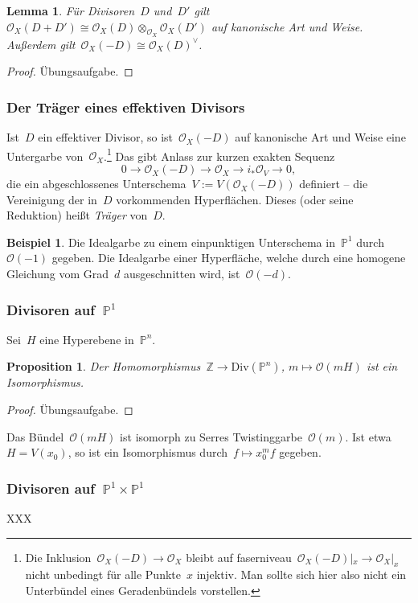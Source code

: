 \documentclass[a4paper,ngerman,12pt]{scrartcl}
\theoremstyle{definition}
\newtheorem{ex}[defn]{Beispiel}
\theoremstyle{plain}
\newtheorem{prop}[defn]{Proposition}
\newtheorem{lemma}[defn]{Lemma}
\theoremstyle{remark}
\newcommand{\ZZ}{\mathbb{Z}}
\newcommand{\PP}{\mathbb{P}}
\renewcommand{\O}{\mathcal{O}}
\newcommand{\lra}{\longrightarrow}
\newcommand{\Div}{\mathrm{Div}}
\begin{document}
\begin{lemma}Für Divisoren~$D$ und~$D'$ gilt~$\O_X(D + D') \cong \O_X(D)
\otimes_{\O_X} \O_X(D')$ auf kanonische Art und Weise. Außerdem gilt~$\O_X(-D)
\cong \O_X(D)^\vee$.\end{lemma}
\begin{proof}Übungsaufgabe.
\end{proof}


\subsubsection*{Der Träger eines effektiven Divisors}

Ist~$D$ ein effektiver Divisor, so ist~$\O_X(-D)$ auf kanonische Art
und Weise eine Untergarbe von~$\O_X$.\footnote{Die Inklusion~$\O_X(-D) \to
\O_X$ bleibt auf faserniveau~$\O_X(-D)|_x \to \O_X|_x$ nicht unbedingt für alle
Punkte~$x$ injektiv. Man sollte sich hier also nicht ein Unterbündel eines
Geradenbündels vorstellen.} Das gibt Anlass zur kurzen exakten Sequenz
\[ 0 \lra \O_X(-D) \lra \O_X \lra i_*\O_V \lra 0, \]
die ein abgeschlossenes Unterschema~$V := V(\O_X(-D))$ definiert -- die Vereinigung
der in~$D$ vorkommenden Hyperflächen. Dieses (oder seine Reduktion) heißt
\emph{Träger} von~$D$.

\begin{ex}Die Idealgarbe zu einem
einpunktigen Unterschema in~$\PP^1$ durch~$\O(-1)$ gegeben. Die Idealgarbe
einer Hyperfläche, welche durch eine homogene Gleichung vom Grad~$d$
ausgeschnitten wird, ist~$\O(-d)$.
\end{ex}


\subsubsection*{Divisoren auf~$\PP^1$}

Sei~$H$ eine Hyperebene in~$\PP^n$.

\begin{prop}Der Homomorphismus~$\ZZ \to \Div(\PP^n)$, $m \mapsto \O(mH)$ ist
ein Isomorphismus.\end{prop}
\begin{proof}Übungsaufgabe.\end{proof}

Das Bündel~$\O(mH)$ ist isomorph zu Serres Twistinggarbe~$\O(m)$. Ist etwa~$H =
V(x_0)$, so ist ein Isomorphismus durch~$f \mapsto x_0^m f$ gegeben.


\subsubsection*{Divisoren auf~$\PP^1 \times \PP^1$}

XXX
\end{document}
